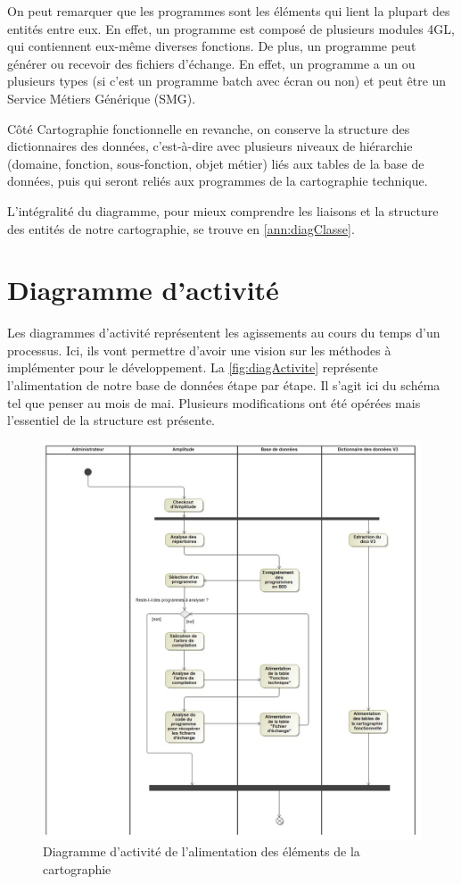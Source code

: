 \documentclass{polytech/polytech}
\begin{document}
On peut remarquer que les programmes sont les éléments qui lient la plupart des entités entre eux. En effet, un programme est composé de plusieurs modules 4GL, qui contiennent eux-même diverses fonctions. De plus, un programme peut générer ou recevoir des fichiers d'échange. En effet, un programme a un ou plusieurs types (si c'est un programme batch avec écran ou non) et peut être un Service Métiers Générique (SMG). 

Côté Cartographie fonctionnelle en revanche, on conserve la structure des dictionnaires des données, c'est-à-dire avec plusieurs niveaux de hiérarchie (domaine, fonction, sous-fonction, objet métier) liés aux tables de la base de données, puis qui seront reliés aux programmes de la cartographie technique. 

L'intégralité du diagramme, pour mieux comprendre les liaisons et la structure des entités de notre cartographie, se trouve en \autoref{ann:diagClasse}.

\section{Diagramme d'activité}

Les diagrammes d'activité représentent les agissements au cours du temps d'un processus. Ici, ils vont permettre d'avoir une vision sur les méthodes à implémenter pour le développement. La \autoref{fig:diagActivite} représente l'alimentation de notre base de données étape par étape. Il s'agit ici du schéma tel que penser au mois de mai. Plusieurs modifications ont été opérées mais l'essentiel de la structure est présente. 

\begin{figure}
	\includegraphics[scale=0.45]{images/Alimentation_initiale}
	\caption{Diagramme d'activité de l'alimentation des éléments de la cartographie}
	\label{fig:diagActivite}
\end{figure}
\end{document}
